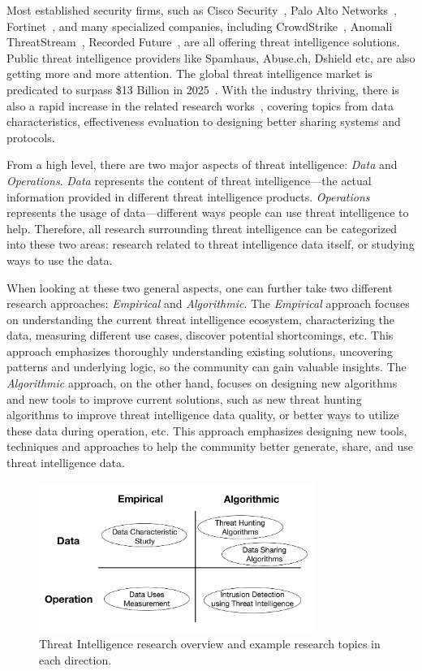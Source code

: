Most established security firms, such as Cisco Security~\cite{ciscotalos}, 
Palo Alto Networks~\cite{panautofocus}, Fortinet~\cite{fortinet}, 
and many specialized companies, including CrowdStrike~\cite{crowdstrike}, 
Anomali ThreatStream~\cite{anomali}, Recorded Future~\cite{recordedfuture}, 
are all offering threat intelligence solutions. Public threat
intelligence providers like Spamhaus, Abuse.ch, Dshield etc, are also 
getting more and more attention. The global threat intelligence market is
predicated to surpass \$13 Billion in 2025~\cite{tipredict2018}. With the
industry thriving, there is also a rapid increase in the related research
works~\cite{tounsi2018survey}, covering topics from data characteristics,
effectiveness evaluation to designing better sharing systems and protocols.

From a high level, there are two major aspects of threat intelligence: 
\textit{Data} and \textit{Operations}. \textit{Data} represents the content 
of threat intelligence---the actual information provided in different threat
intelligence products. \textit{Operations} represents the usage of 
data---different ways people can use threat intelligence to help. Therefore,
all research surrounding threat intelligence can be categorized into
these two areas: research related to threat intelligence data itself, or 
studying ways to use the data.

When looking at these two general aspects, one can further 
take two different research approaches: \textit{Empirical} and 
\textit{Algorithmic}. The \textit{Empirical} approach focuses on 
understanding the current threat intelligence ecosystem, characterizing 
the data, measuring different use cases, discover potential 
shortcomings, etc. This approach emphasizes thoroughly understanding
existing solutions, uncovering patterns and underlying logic, so the 
community can gain valuable insights. The \textit{Algorithmic} approach, 
on the other hand, focuses on designing new algorithms and new tools to 
improve current solutions, such as new threat hunting algorithms to improve 
threat intelligence data quality, or better ways to utilize these data 
during operation, etc. This approach emphasizes designing new tools,
techniques and approaches to help the community better generate, share, 
and use threat intelligence data.

\begin{figure}
\centering
\includegraphics[width=0.8\textwidth]{threat_intel_research_overview.pdf}
\caption{Threat Intelligence research overview and example research
topics in each direction.}
\label{fig:threat_intel_overview}
\end{figure}

